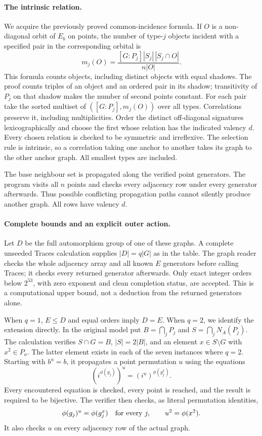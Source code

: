 \documentclass[11pt]{article}
\begin{document}
\paragraph{The intrinsic relation.}
We acquire the previously proved common-incidence formula. If $O$ is a
non-diagonal orbit of $E_b$ on points, the number of type-$j$ objects
incident with a specified pair in the corresponding orbital is
\[
 m_j(O)=\frac{[G:P_j]|S_j|\,|S_j\cap O|}{n|O|}.
\]
This formula counts objects, including distinct objects with equal shadows.
The proof counts triples of an object and an ordered pair in its shadow;
transitivity of $P_j$ on that shadow makes the number of second points
constant. For each pair take the sorted multiset of $([G:P_j],m_j(O))$
over all types. Correlations preserve it, including multiplicities. Order
the distinct off-diagonal signatures lexicographically and choose the
first whose relation has the indicated valency $d$. Every chosen relation
is checked to be symmetric and irreflexive. The selection rule is intrinsic,
so a correlation taking one anchor to another takes its graph to the
other anchor graph. All smallest types are included.

The base neighbour set is propagated along the verified point generators.
The program visits all $n$ points and checks every adjacency row under
every generator afterwards. Thus possible conflicting propagation paths
cannot silently produce another graph. All rows have valency $d$.

\newpage
\paragraph{Complete bounds and an explicit outer action.}
Let $D$ be the full automorphism group of one of these graphs. A complete
unseeded Traces calculation supplies $|D|=q|G|$ as in the table. The graph
reader checks the whole adjacency array and all known $E$ generators
before calling Traces; it checks every returned generator afterwards.
Only exact integer orders below $2^{53}$, with zero exponent and clean
completion status, are accepted. This is a computational upper bound,
not a deduction from the returned generators alone.

When $q=1$, $E\le D$ and equal orders imply $D=E$. When $q=2$, we
identify the extension directly. In the original model put
$B=\bigcap_jP_j$ and $S=\bigcap_jN_A(P_j)$. The calculation verifies
$S\cap G=B$, $|S|=2|B|$, and an element $x\in S\setminus G$ with
$x^2\in P_a$. The latter element exists in each of the seven instances
where $q=2$. Starting with $b^u=b$, it propagates a point permutation $u$
using the equations
\[
 (i^{\phi(g_j)})^u=(i^u)^{\phi(g_j^x)}.
\]
Every encountered equation is checked, every point is reached, and the
result is required to be bijective. The verifier then checks, as literal
permutation identities,
\[
 \phi(g_j)^u=\phi(g_j^x)\quad\hbox{for every }j,
 \qquad u^2=\phi(x^2).
\]
It also checks $u$ on every adjacency row of the actual graph.
\end{document}
